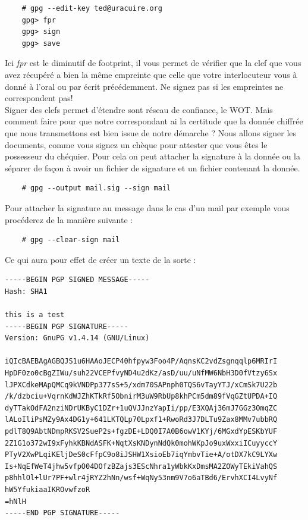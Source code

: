 \documentclass[a4paper]{article}
\begin{document}
\begin{verbatim}
    # gpg --edit-key ted@uracuire.org
    gpg> fpr
    gpg> sign
    gpg> save
\end{verbatim}

Ici \emph{fpr} est le diminutif de footprint, il vous permet de vérifier que la
clef que vous avez récupéré a bien la même empreinte que celle que votre
interlocuteur vous à donné à l'oral ou par écrit précédemment.
Ne signez pas si les empreintes ne correspondent pas!
\\
Signer des clefs permet d'étendre sont réseau de confiance, le WOT. Mais comment
faire pour que notre correspondant ai la certitude que la donnée chiffrée que
nous transmettons est bien issue de notre démarche ? Nous allons signer les
documents, comme vous signez un chèque pour attester que vous êtes le possesseur
du chéquier. Pour cela on peut attacher la signature à la donnée ou la séparer
de façon à avoir un fichier de signature et un fichier contenant la donnée.

\begin{verbatim}
    # gpg --output mail.sig --sign mail
\end{verbatim}

Pour attacher la signature au message dans le cas d'un mail par exemple vous
procéderez de la manière suivante :
\begin{verbatim}
    # gpg --clear-sign mail
\end{verbatim}
\newline
Ce qui aura pour effet de créer un texte de la sorte :
\begin{verbatim}
-----BEGIN PGP SIGNED MESSAGE-----
Hash: SHA1

this is a test
-----BEGIN PGP SIGNATURE-----
Version: GnuPG v1.4.14 (GNU/Linux)

iQIcBAEBAgAGBQJS1u6HAAoJECP40hfpyw3Foo4P/AqnsKC2vdZsgnqqlp6MRIrI
HpDF0zo0cBgZIWu/suh22VCEPfvyND4u2dKz/asD/uu/uNfMW6NbH3D0fVtzy6Sx
lJPXCdkeMApQMCq9kVNDPp377sS+5/xdm70SAPnph0TQS6vTayYTJ/xCmSk7U22b
/k/dzbciu+VqrnKdWJZhKTkRf5ObnirM3uW9RbUp8khPCm5dm89fVqGZtUPDA+IQ
dyTTakOdFA2nziNDrUKByC1DZr+1uQVJJnzYapIi/pp/E3XQAj36mJ7GGz3OmqZC
lALoIliPsMZy9Ax4DG1y+641LKTQLp70Lpxf1+RwoRd3J7DLTu9Zax8MMv7ubbRQ
pdlT8Q9AbtNDmpRKSV2SueP2s+fgzDE+LDQ0I7A0B6owV1KYj/6MGxdYpESKbYUF
2Z1G1o372wI9xFyhkKBNdASFK+NqtXsKNDynNdQk0mohWKpJo9uxWxxiICuyyccY
PTyV2XwPLqiKEljDeS0cFfpC9o8iJSHW1XsioEb7iqYmbvTie+A/otDX7kC9LYXw
Is+NqEfWeT4jhw5vfpO04DOfzBZajs3EScNhra1yWbkKxDmsMA2ZOWyTEkiVahQS
p8hhlOl+lUr7PF+wlr4jRYZ2hNn/wsf+WqNy53nm9V7o6aTBd6/ErvhXCI4LvyNf
hW5YfukiaaIKROvwfzoR
=hNlH
-----END PGP SIGNATURE-----
\end{verbatim}
\end{document}
